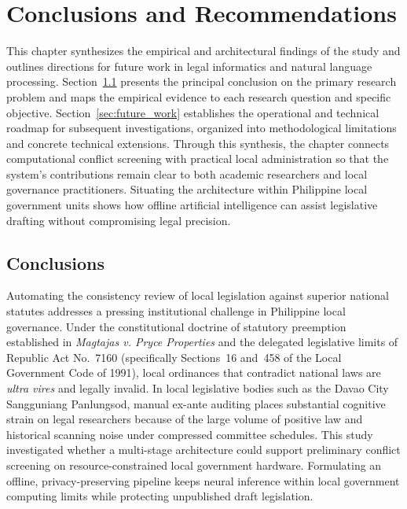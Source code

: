 
\chapter{Conclusions and Recommendations}
\label{chap:conclusions_and_recommendations}

This chapter synthesizes the empirical and architectural findings of the study and outlines directions for future work in legal informatics and natural language processing. Section~\ref{sec:conclusions} presents the principal conclusion on the primary research problem and maps the empirical evidence to each research question and specific objective. Section~\ref{sec:future_work} establishes the operational and technical roadmap for subsequent investigations, organized into methodological limitations and concrete technical extensions. Through this synthesis, the chapter connects computational conflict screening with practical local administration so that the system's contributions remain clear to both academic researchers and local governance practitioners. Situating the architecture within Philippine local government units shows how offline artificial intelligence can assist legislative drafting without compromising legal precision.


\section{Conclusions}
\label{sec:conclusions}

Automating the consistency review of local legislation against superior national statutes addresses a pressing institutional challenge in Philippine local governance. Under the constitutional doctrine of statutory preemption established in \textit{Magtajas v. Pryce Properties} and the delegated legislative limits of Republic Act No.~7160 (specifically Sections~16 and~458 of the Local Government Code of 1991), local ordinances that contradict national laws are \textit{ultra vires} and legally invalid. In local legislative bodies such as the Davao City Sangguniang Panlungsod, manual ex-ante auditing places substantial cognitive strain on legal researchers because of the large volume of positive law and historical scanning noise under compressed committee schedules. This study investigated whether a multi-stage architecture could support preliminary conflict screening on resource-constrained local government hardware. Formulating an offline, privacy-preserving pipeline keeps neural inference within local government computing limits while protecting unpublished draft legislation.

